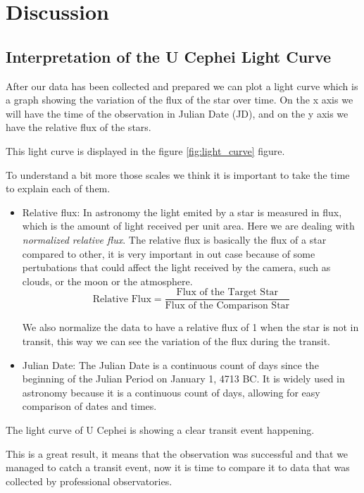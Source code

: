 \documentclass[12pt,a4paper]{article}
\begin{document}
\section{Discussion}

\subsection{Interpretation of the U Cephei Light Curve}

After our data has been collected and prepared we can plot a light curve which is a graph showing the variation of the flux of the star over time.
On the x axis we will have the time of the observation in Julian Date (JD), and on the y axis we have the relative flux of the stars.

This light curve is displayed in the figure \ref{fig:light_curve} figure.

To understand a bit more those scales we think it is important to take the time to explain each of them.
\begin{itemize}
    \item Relative flux: In astronomy the light emited by a star is measured in flux, which is the amount of light received per unit area. Here we are dealing with \textit{normalized relative flux}. 
    The relative flux is basically the flux of a star compared to other, it is very important in out case because of some pertubations that could affect the light received by the camera, such as clouds, or the moon or the atmosphere.
    \begin{equation}
        \text{Relative Flux} = \frac{\text{Flux of the Target Star}}{\text{Flux of the Comparison Star}}
    \end{equation}

    We also normalize the data to have a relative flux of 1 when the star is not in transit, this way we can see the variation of the flux during the transit.
    \item Julian Date: The Julian Date is a continuous count of days since the beginning of the Julian Period on January 1, 4713 BC. 
    It is widely used in astronomy because it is a continuous count of days, allowing for easy comparison of dates and times.
\end{itemize}


The light curve of U Cephei is showing a clear transit event happening.

This is a great result, it means that the observation was successful and that we managed to catch a transit event, now it is time to compare it to data that was collected by professional observatories.
\medskip
\end{document}
